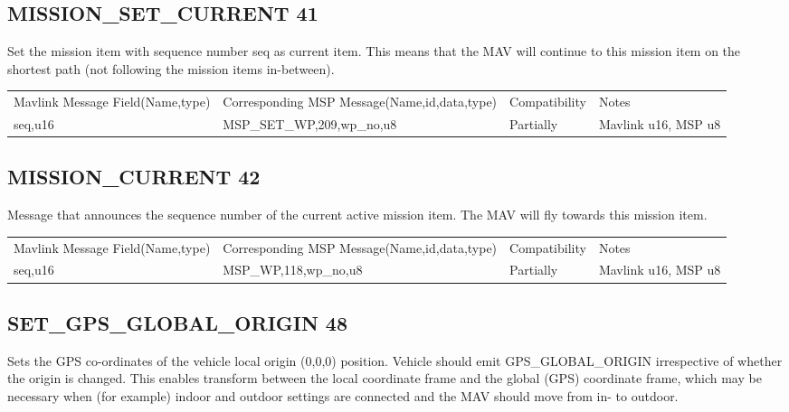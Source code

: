 \cleardoublepage



\subsection{MISSION\_SET\_CURRENT 41} 
Set the mission item with sequence number seq as current item. This means that the MAV will continue to this mission item on the shortest path (not following the mission items in-between). \\

{
\centering
\begin{tabular}{ |p{4cm  } |p{7cm} | p{2cm}|m{5em}|}
\hline
Mavlink Message Field(Name,type)&Corresponding MSP Message(Name,id,data,type)& Compatibility & Notes\\
\rowcolor{lightgray}
seq,u16 & MSP\_SET\_WP,209,wp\_no,u8& Partially  & Mavlink u16, MSP u8  \\

\end{tabular}
}
\cleardoublepage



\subsection{MISSION\_CURRENT 42} 
Message that announces the sequence number of the current active mission item. The MAV will fly towards this mission item. \\ 

{
\centering
\begin{tabular}{ |p{4cm  } |p{7cm} | p{2cm}|m{5em}|}
\hline
Mavlink Message Field(Name,type)&Corresponding MSP Message(Name,id,data,type)& Compatibility & Notes\\
\rowcolor{lightgray}
seq,u16 & MSP\_WP,118,wp\_no,u8& Partially  & Mavlink u16, MSP u8  \\

\end{tabular}
}
\cleardoublepage



\subsection{SET\_GPS\_GLOBAL\_ORIGIN 48} 
Sets the GPS co-ordinates of the vehicle local origin (0,0,0) position. Vehicle should emit GPS\_GLOBAL\_ORIGIN irrespective of whether the origin is changed. This enables transform between the local coordinate frame and the global (GPS) coordinate frame, which may be necessary when (for example) indoor and outdoor settings are connected and the MAV should move from in- to outdoor. \\


